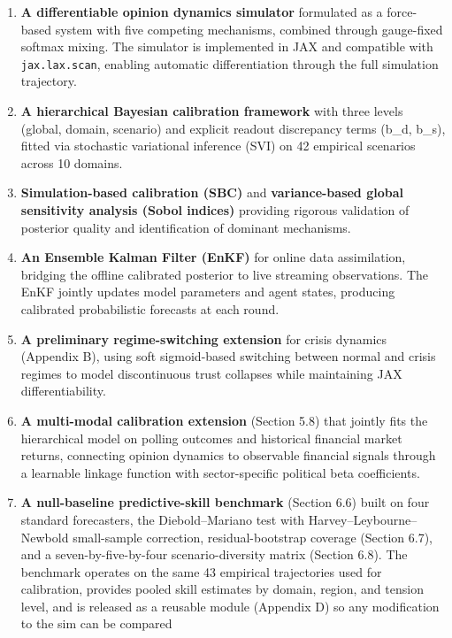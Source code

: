 \documentclass[
]{article}
\begin{document}
\begin{enumerate}
\def\labelenumi{\arabic{enumi}.}
\item
  \textbf{A differentiable opinion dynamics simulator} formulated as a
  force-based system with five competing mechanisms, combined through
  gauge-fixed softmax mixing. The simulator is implemented in JAX and
  compatible with \texttt{jax.lax.scan}, enabling automatic
  differentiation through the full simulation trajectory.
\item
  \textbf{A hierarchical Bayesian calibration framework} with three
  levels (global, domain, scenario) and explicit readout discrepancy
  terms (b\_d, b\_s), fitted via stochastic variational inference (SVI)
  on 42 empirical scenarios across 10 domains.
\item
  \textbf{Simulation-based calibration (SBC)} and \textbf{variance-based
  global sensitivity analysis (Sobol indices)} providing rigorous
  validation of posterior quality and identification of dominant
  mechanisms.
\item
  \textbf{An Ensemble Kalman Filter (EnKF)} for online data
  assimilation, bridging the offline calibrated posterior to live
  streaming observations. The EnKF jointly updates model parameters and
  agent states, producing calibrated probabilistic forecasts at each
  round.
\item
  \textbf{A preliminary regime-switching extension} for crisis dynamics
  (Appendix B), using soft sigmoid-based switching between normal and
  crisis regimes to model discontinuous trust collapses while
  maintaining JAX differentiability.
\item
  \textbf{A multi-modal calibration extension} (Section 5.8) that
  jointly fits the hierarchical model on polling outcomes and historical
  financial market returns, connecting opinion dynamics to observable
  financial signals through a learnable linkage function with
  sector-specific political beta coefficients.
\item
  \textbf{A null-baseline predictive-skill benchmark} (Section 6.6)
  built on four standard forecasters, the Diebold--Mariano test with
  Harvey--Leybourne--Newbold small-sample correction, residual-bootstrap
  coverage (Section 6.7), and a seven-by-five-by-four scenario-diversity
  matrix (Section 6.8). The benchmark operates on the same 43 empirical
  trajectories used for calibration, provides pooled skill estimates by
  domain, region, and tension level, and is released as a reusable
  module (Appendix D) so any modification to the sim can be compared

\end{enumerate}
\end{document}
